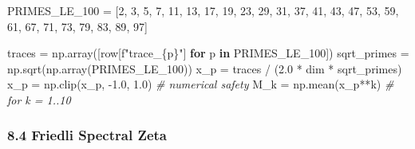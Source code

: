 \documentclass[
]{article}
\newenvironment{Shaded}{}{}
\newcommand{\CommentTok}[1]{\textcolor[rgb]{0.38,0.63,0.69}{\textit{#1}}}
\newcommand{\ControlFlowTok}[1]{\textcolor[rgb]{0.00,0.44,0.13}{\textbf{#1}}}
\newcommand{\DecValTok}[1]{\textcolor[rgb]{0.25,0.63,0.44}{#1}}
\newcommand{\FloatTok}[1]{\textcolor[rgb]{0.25,0.63,0.44}{#1}}
\newcommand{\KeywordTok}[1]{\textcolor[rgb]{0.00,0.44,0.13}{\textbf{#1}}}
\newcommand{\NormalTok}[1]{#1}
\newcommand{\OperatorTok}[1]{\textcolor[rgb]{0.40,0.40,0.40}{#1}}
\newcommand{\SpecialCharTok}[1]{\textcolor[rgb]{0.25,0.44,0.63}{#1}}
\newcommand{\SpecialStringTok}[1]{\textcolor[rgb]{0.73,0.40,0.53}{#1}}
\begin{document}
\begin{Shaded}
\begin{Highlighting}[]
\NormalTok{PRIMES\_LE\_100 }\OperatorTok{=}\NormalTok{ [}\DecValTok{2}\NormalTok{, }\DecValTok{3}\NormalTok{, }\DecValTok{5}\NormalTok{, }\DecValTok{7}\NormalTok{, }\DecValTok{11}\NormalTok{, }\DecValTok{13}\NormalTok{, }\DecValTok{17}\NormalTok{, }\DecValTok{19}\NormalTok{, }\DecValTok{23}\NormalTok{, }\DecValTok{29}\NormalTok{, }\DecValTok{31}\NormalTok{, }\DecValTok{37}\NormalTok{,}
                 \DecValTok{41}\NormalTok{, }\DecValTok{43}\NormalTok{, }\DecValTok{47}\NormalTok{, }\DecValTok{53}\NormalTok{, }\DecValTok{59}\NormalTok{, }\DecValTok{61}\NormalTok{, }\DecValTok{67}\NormalTok{, }\DecValTok{71}\NormalTok{, }\DecValTok{73}\NormalTok{, }\DecValTok{79}\NormalTok{, }\DecValTok{83}\NormalTok{, }\DecValTok{89}\NormalTok{, }\DecValTok{97}\NormalTok{]}

\NormalTok{traces }\OperatorTok{=}\NormalTok{ np.array([row[}\SpecialStringTok{f"trace\_}\SpecialCharTok{\{}\NormalTok{p}\SpecialCharTok{\}}\SpecialStringTok{"}\NormalTok{] }\ControlFlowTok{for}\NormalTok{ p }\KeywordTok{in}\NormalTok{ PRIMES\_LE\_100])}
\NormalTok{sqrt\_primes }\OperatorTok{=}\NormalTok{ np.sqrt(np.array(PRIMES\_LE\_100))}
\NormalTok{x\_p }\OperatorTok{=}\NormalTok{ traces }\OperatorTok{/}\NormalTok{ (}\FloatTok{2.0} \OperatorTok{*}\NormalTok{ dim }\OperatorTok{*}\NormalTok{ sqrt\_primes)}
\NormalTok{x\_p }\OperatorTok{=}\NormalTok{ np.clip(x\_p, }\OperatorTok{{-}}\FloatTok{1.0}\NormalTok{, }\FloatTok{1.0}\NormalTok{)  }\CommentTok{\# numerical safety}
\NormalTok{M\_k }\OperatorTok{=}\NormalTok{ np.mean(x\_p}\OperatorTok{**}\NormalTok{k)  }\CommentTok{\# for k = 1..10}
\end{Highlighting}
\end{Shaded}

\hypertarget{friedli-spectral-zeta}{%
\subsubsection{8.4 Friedli Spectral Zeta}\label{friedli-spectral-zeta}}
\end{document}
